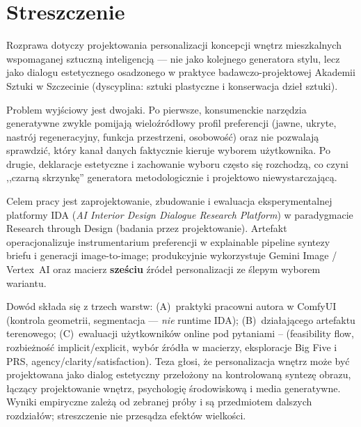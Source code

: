 \chapter*{Streszczenie}

Rozprawa dotyczy projektowania personalizacji koncepcji wnętrz mieszkalnych wspomaganej sztuczną inteligencją --- nie jako kolejnego generatora stylu, lecz jako dialogu estetycznego osadzonego w praktyce badawczo-projektowej Akademii Sztuki w Szczecinie (dyscyplina: sztuki plastyczne i konserwacja dzieł sztuki).

Problem wyjściowy jest dwojaki. Po pierwsze, konsumenckie narzędzia generatywne zwykle pomijają wieloźródłowy profil preferencji (jawne, ukryte, nastrój regeneracyjny, funkcja przestrzeni, osobowość) oraz nie pozwalają sprawdzić, który kanał danych faktycznie kieruje wyborem użytkownika. Po drugie, deklaracje estetyczne i zachowanie wyboru często się rozchodzą, co czyni ,,czarną skrzynkę'' generatora metodologicznie i projektowo niewystarczającą.

Celem pracy jest zaprojektowanie, zbudowanie i ewaluacja eksperymentalnej platformy IDA (\emph{AI Interior Design Dialogue Research Platform}) w paradygmacie Research through Design (badania przez projektowanie). Artefakt operacjonalizuje instrumentarium preferencji w explainable pipeline syntezy briefu i generacji image-to-image; produkcyjnie wykorzystuje Gemini Image / Vertex~AI oraz macierz \textbf{sześciu} źródeł personalizacji ze ślepym wyborem wariantu.

Dowód składa się z trzech warstw: (A)~praktyki pracowni autora w ComfyUI (kontrola geometrii, segmentacja --- \emph{nie} runtime IDA); (B)~działającego artefaktu terenowego; (C)~ewaluacji użytkowników online pod pytaniami -- (feasibility flow, rozbieżność implicit/explicit, wybór źródła w macierzy, eksploracje Big Five i PRS, agency/clarity/satisfaction). Teza głosi, że personalizacja wnętrz może być projektowana jako dialog estetyczny przełożony na kontrolowaną syntezę obrazu, łączący projektowanie wnętrz, psychologię środowiskową i media generatywne. Wyniki empiryczne zależą od zebranej próby i są przedmiotem dalszych rozdziałów; streszczenie nie przesądza efektów wielkości.


